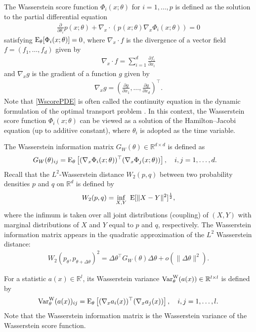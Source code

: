 \documentclass[11pt, a4paper]{article}
\begin{document}
The Wasserstein score function $\Phi_i(x;\theta)$ for $i=1,\dots,p$ is defined as the solution to the partial differential equation
\begin{align}\label{WscorePDE}
	\frac{\partial}{\partial \theta_i} p(x;\theta) + \nabla_x \cdot \left( p(x;\theta) \nabla_x \Phi_i(x;\theta) \right) = 0
\end{align}
satisfying ${\rm E}_{\theta}[\Phi_i(x;\theta)] = 0$, where $\nabla_x \cdot f$ is the divergence of a vector field $f=(f_1,\dots,f_d)$ given by
\begin{align*}
	\nabla_x \cdot f = \sum_{i=1}^d \frac{\partial f_i}{\partial x_i}
\end{align*}
and $\nabla_x g$ is the gradient of a function $g$ given by
\begin{align*}
	\nabla_x g = \left( \frac{\partial g}{\partial x_1}, \dots, \frac{\partial g}{\partial x_d} \right)^{\top}.
\end{align*}
Note that \eqref{WscorePDE} is often called the continuity equation in the dynamic formulation of the optimal transport problem \cite{benamou,villani2}.
In this context, the Wasserstein score function $\Phi_i(x;\theta)$ can be viewed as a solution of the Hamilton--Jacobi equation (up to additive constant), where $\theta_i$ is adopted as the time variable.

The Wasserstein information matrix $G_W(\theta) \in \mathbb{R}^{d\times d}$ is defined as
\begin{align*}
	G_W(\theta)_{ij} &={\rm E}_{\theta} \left[ (\nabla_x \Phi_i(x;\theta))^{\top} (\nabla_x \Phi_j(x;\theta)) \right], \quad i,j=1,\dots,d.
\end{align*}
Recall that the $L^2$-Wasserstein distance $W_2(p,q)$ between two probability densities $p$ and $q$ on $\mathbb{R}^d$ is defined by
\begin{align*}
	W_2 (p,q) = \inf_{X,Y} \ {\rm E} [ \| X-Y\|^2 ] ^{\frac{1}{2}},
\end{align*}
where the infimum is taken over all joint distributions (coupling) of $(X,Y)$ with marginal distributions of $X$ and $Y$ equal to $p$ and $q$, respectively.
The Wasserstein information matrix appears in the quadratic approximation of the $L^2$ Wasserstein distance:
\begin{align*}
	W_2(p_\theta,p_{\theta+\Delta\theta})^2 = \Delta\theta^\top G_W(\theta) \Delta\theta + o(\|\Delta\theta\|^2).
\end{align*}


For a statistic $a(x)\in\mathbb{R}^l$, its Wasserstein variance ${\rm Var}_{\theta}^{\mathrm{W}}(a(x))\in\mathbb{R}^{l\times l}$ is defined by
\begin{align*}
	{\rm Var}_{\theta}^{\mathrm{W}}(a(x))_{ij}= {\rm E}_{\theta} \left[ (\nabla_x a_i(x))^{\top} (\nabla_x a_j(x)) \right], \quad i,j=1,\dots,l.
\end{align*}
Note that the Wasserstein information matrix is the Wasserstein variance of the Wasserstein score function.
\end{document}
